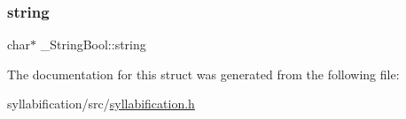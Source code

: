 \subsubsection{\texorpdfstring{string}{string}}
{\footnotesize\ttfamily char$\ast$ \+\_\+\+String\+Bool\+::string}



The documentation for this struct was generated from the following file\+:\begin{DoxyCompactItemize}
\item 
syllabification/src/\mbox{\hyperlink{syllabification_8h}{syllabification.\+h}}\end{DoxyCompactItemize}
